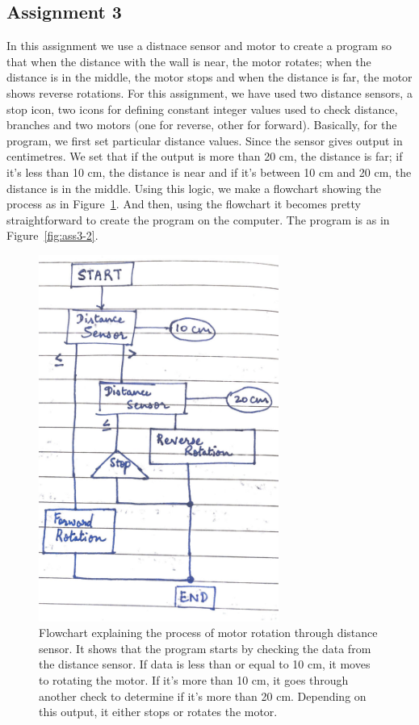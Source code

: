 \documentclass[12pt,a4paper]{report}
\begin{document}
\subsection{\textbf{Assignment 3}}
In this assignment we use a distnace sensor and motor to create a program so that when the distance with the 
wall is near, the motor rotates; when the distance is in the middle, the motor stops and when the 
distance is far, the motor shows reverse rotations. 
For this assignment, we have used two distance sensors, a stop icon, two icons for defining constant integer 
values used to check distance, branches and two motors (one for reverse, other for forward). 
Basically, for the program, we first set particular distance values. Since the sensor gives output in centimetres. 
We set that if the output is more than 20 cm, the distance is far; if it's less than 10 cm, the distance is near 
and if it's between 10 cm and 20 cm, the distance is in the middle. Using this logic, we make a flowchart showing 
the process as in Figure~\ref{fig:ass3-1}. And then, using the flowchart it becomes pretty straightforward to 
create the program on the computer. The program is as in Figure~\ref{fig:ass3-2}. 
\begin{figure}[htbp]
    \centering
    \includegraphics[width=0.7\textwidth]{figures/ass3-1.jpg}
    \caption{Flowchart explaining the process of motor rotation through distance sensor. It shows that the program 
    starts by checking the data from the distance sensor. If data is less than or equal to 10 cm, it moves 
    to rotating the motor. If it's more than 10 cm, it goes through another check to determine if it's more than 
    20 cm. Depending on this output, it either stops or rotates the motor.}
    \label{fig:ass3-1}
\end{figure}
\end{document}
